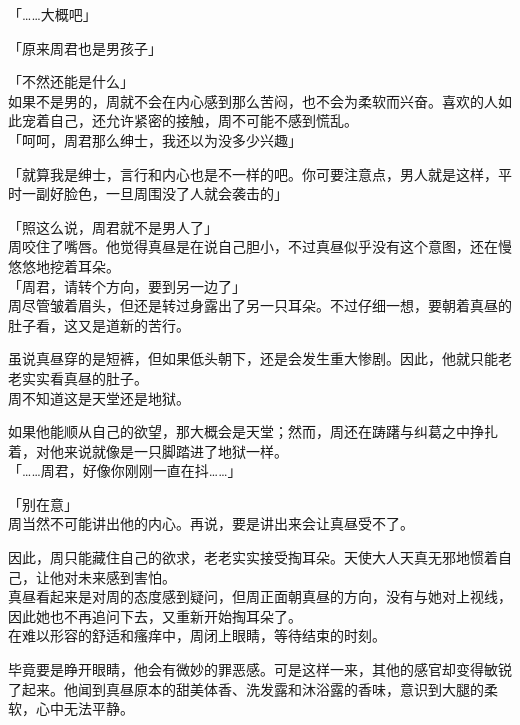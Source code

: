 「……大概吧」

「原来周君也是男孩子」

「不然还能是什么」\\

如果不是男的，周就不会在内心感到那么苦闷，也不会为柔软而兴奋。喜欢的人如此宠着自己，还允许紧密的接触，周不可能不感到慌乱。\\

「呵呵，周君那么绅士，我还以为没多少兴趣」

「就算我是绅士，言行和内心也是不一样的吧。你可要注意点，男人就是这样，平时一副好脸色，一旦周围没了人就会袭击的」

「照这么说，周君就不是男人了」\\

周咬住了嘴唇。他觉得真昼是在说自己胆小，不过真昼似乎没有这个意图，还在慢悠悠地挖着耳朵。\\

「周君，请转个方向，要到另一边了」\\

周尽管皱着眉头，但还是转过身露出了另一只耳朵。不过仔细一想，要朝着真昼的肚子看，这又是道新的苦行。

虽说真昼穿的是短裤，但如果低头朝下，还是会发生重大惨剧。因此，他就只能老老实实看真昼的肚子。\\

周不知道这是天堂还是地狱。

如果他能顺从自己的欲望，那大概会是天堂；然而，周还在踌躇与纠葛之中挣扎着，对他来说就像是一只脚踏进了地狱一样。\\

「……周君，好像你刚刚一直在抖……」

「别在意」\\

周当然不可能讲出他的内心。再说，要是讲出来会让真昼受不了。

因此，周只能藏住自己的欲求，老老实实接受掏耳朵。天使大人天真无邪地惯着自己，让他对未来感到害怕。\\

真昼看起来是对周的态度感到疑问，但周正面朝真昼的方向，没有与她对上视线，因此她也不再追问下去，又重新开始掏耳朵了。\\

在难以形容的舒适和瘙痒中，周闭上眼睛，等待结束的时刻。

毕竟要是睁开眼睛，他会有微妙的罪恶感。可是这样一来，其他的感官却变得敏锐了起来。他闻到真昼原本的甜美体香、洗发露和沐浴露的香味，意识到大腿的柔软，心中无法平静。\\

